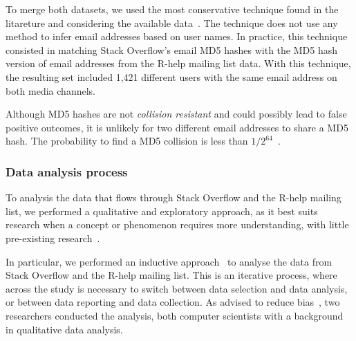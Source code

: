 \documentclass{sig-alternate-05-2015}
\begin{document}
To merge both datasets, we used the most conservative technique found in the litareture and considering the available data~\cite{Vasilescu2014b}.
The technique does not use any method to infer email addresses based on user names.
In practice, this technique consisted in matching Stack Overflow's email MD5 hashes with the MD5 hash version of email addresses from the R-help mailing list data.
With this technique, the resulting set included 1,421 different users with the same email address on both media channels.


	Although MD5 hashes are not \textit{collision resistant} and could possibly lead to false positive outcomes, it is unlikely for two different email addresses to share a MD5 hash.
    The probability to find a MD5 collision is less than $1/2^{64}$~\cite{Rivest1992}.

\subsubsection{Data analysis process}
\label{sec:dap}

To analysis the data that flows through Stack Overflow and the R-help mailing list, we performed a qualitative and exploratory approach, as it best suits research when a concept or phenomenon requires more understanding, with little pre-existing research~\cite{Creswell2009}.

In particular, we performed an inductive approach~\cite{Runeson2012} to analyse the data from Stack Overflow and the R-help mailing list.
This is an iterative process, where across the study is necessary to switch between data selection and data analysis, or between data reporting and data collection.
As advised to reduce bias~\cite{Runeson2012}, two researchers conducted the analysis, both computer scientists with a background in qualitative data analysis.
\end{document}
